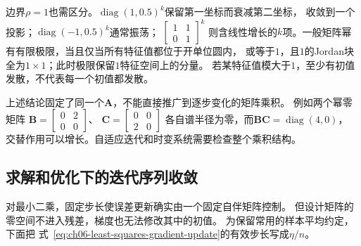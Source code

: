 边界$\rho=1$也需区分。$\operatorname{diag}(1,0.5)^k$保留第一坐标而衰减第二坐标，
收敛到一个投影；$\operatorname{diag}(-1,0.5)^k$通常振荡；
$\left[\begin{smallmatrix}1&1\\0&1\end{smallmatrix}\right]^k$
则含线性增长的$k$项。一般矩阵幂有有限极限，当且仅当所有特征值都位于开单位圆内，
或等于$1$，且$1$的Jordan块全为$1\times1$；此时极限保留$1$特征空间上的分量。
若某特征值模大于$1$，至少有初值发散，不代表每一个初值都发散。

上述结论固定了同一个$\bm A$，不能直接推广到逐步变化的矩阵乘积。
例如两个幂零矩阵
$\bm B=\left[\begin{smallmatrix}0&2\\0&0\end{smallmatrix}\right]$、
$\bm C=\left[\begin{smallmatrix}0&0\\2&0\end{smallmatrix}\right]$
各自谱半径为零，而$\bm B\bm C=\operatorname{diag}(4,0)$，
交替作用可以增长。自适应迭代和时变系统需要检查整个乘积结构。

\subsection{求解和优化下的迭代序列收敛}
\label{sec:linear-algebra-iteration-convergence}
\label{sec:ch06-gradient-convergence}

对最小二乘，固定步长使误差更新确实由一个固定自伴矩阵控制。
但设计矩阵的零空间不进入残差，梯度也无法修改其中的初值。
为保留常用的样本平均约定，下面把
式~\eqref{eq:ch06-least-squares-gradient-update}的有效步长写成$\eta/n$。

